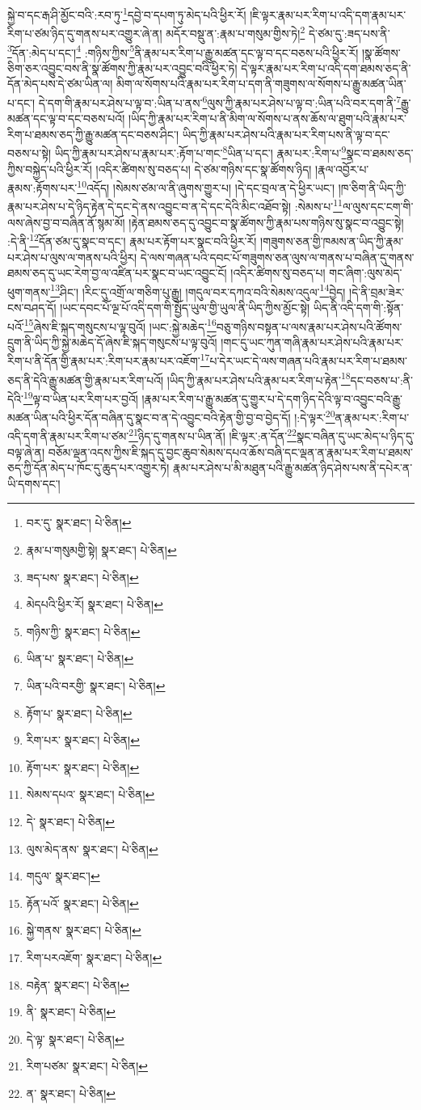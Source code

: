 སྐྱེ་བ་དང་རྒ་ཤི་མྱོང་བའི་:རབ་ཏུ་\footnote{བར་དུ་  སྣར་ཐང་།  པེ་ཅིན། }དབྱེ་བ་དཔག་ཏུ་མེད་པའི་ཕྱིར་རོ། །ཇི་ལྟར་རྣམ་པར་རིག་པ་འདི་དག་རྣམ་པར་རིག་པ་ཙམ་ཉིད་དུ་གནས་པར་འགྱུར་ཞེ་ན། མདོར་བསྡུ་ན་:རྣམ་པ་གསུམ་གྱིས་ཏེ།\footnote{རྣམ་པ་གསུམགྱི་སྟེ།  སྣར་ཐང་།  པེ་ཅིན། } དེ་ཙམ་དུ་:ཟད་པས་ནི་\footnote{ཟད་པས་  སྣར་ཐང་།  པེ་ཅིན། }དོན་:མེད་པ་དང་།\footnote{མེདཔའི་ཕྱིར་རོ།  སྣར་ཐང་།  པེ་ཅིན། } :གཉིས་ཀྱིས་\footnote{གཉིས་ཀྱི་  སྣར་ཐང་།  པེ་ཅིན། }ནི་རྣམ་པར་རིག་པ་རྒྱུ་མཚན་དང་ལྟ་བ་དང་བཅས་པའི་ཕྱིར་རོ། །སྣ་ཚོགས་ཅིག་ཅར་འབྱུང་བས་ནི་སྣ་ཚོགས་ཀྱི་རྣམ་པར་འབྱུང་བའི་ཕྱིར་ཏེ། དེ་ལྟར་རྣམ་པར་རིག་པ་འདི་དག་ཐམས་ཅད་ནི་དོན་མེད་པས་དེ་ཙམ་ཡིན་ལ། མིག་ལ་སོགས་པའི་རྣམ་པར་རིག་པ་དག་ནི་གཟུགས་ལ་སོགས་པ་རྒྱུ་མཚན་ཡིན་པ་དང་། དེ་དག་གི་རྣམ་པར་ཤེས་པ་ལྟ་བ་:ཡིན་པ་ནས་\footnote{ཡིན་པ་  སྣར་ཐང་།  པེ་ཅིན། }ལུས་ཀྱི་རྣམ་པར་ཤེས་པ་ལྟ་བ་:ཡིན་པའི་བར་དག་ནི་\footnote{ཡིན་པའི་བརགྱི་  སྣར་ཐང་།  པེ་ཅིན། }རྒྱུ་མཚན་དང་ལྟ་བ་དང་བཅས་པའོ། །ཡིད་ཀྱི་རྣམ་པར་རིག་པ་ནི་མིག་ལ་སོགས་པ་ནས་ཆོས་ལ་ཐུག་པའི་རྣམ་པར་རིག་པ་ཐམས་ཅད་ཀྱི་རྒྱུ་མཚན་དང་བཅས་ཤིང་། ཡིད་ཀྱི་རྣམ་པར་ཤེས་པའི་རྣམ་པར་རིག་པས་ནི་ལྟ་བ་དང་བཅས་པ་སྟེ། ཡིད་ཀྱི་རྣམ་པར་ཤེས་པ་རྣམ་པར་:རྟོག་པ་གང་\footnote{རྟོག་པ་  སྣར་ཐང་།  པེ་ཅིན། }ཡིན་པ་དང་། རྣམ་པར་:རིག་པ་\footnote{རིག་པར་  སྣར་ཐང་།  པེ་ཅིན། }སྣང་བ་ཐམས་ཅད་ཀྱིས་བསྐྱེད་པའི་ཕྱིར་རོ། །འདིར་ཚིགས་སུ་བཅད་པ། དེ་ཙམ་གཉིས་དང་སྣ་ཚོགས་ཉིད། །རྣལ་འབྱོར་པ་རྣམས་:རྟོགས་པར་\footnote{རྟོག་པར་  སྣར་ཐང་།  པེ་ཅིན། }འདོད། །སེམས་ཙམ་ལ་ནི་ཞུགས་གྱུར་པ། །དེ་དང་བྲལ་ན་དེ་ཕྱིར་ཡང་། །ཁ་ཅིག་ནི་ཡིད་ཀྱི་རྣམ་པར་ཤེས་པ་དེ་ཉིད་རྟེན་དེ་དང་དེ་ནས་འབྱུང་བ་ན་དེ་དང་དེའི་མིང་འཐོབ་སྟེ། :སེམས་པ་\footnote{སེམས་དཔའ་  སྣར་ཐང་།  པེ་ཅིན། }ལ་ལུས་དང་ངག་གི་ལས་ཞེས་བྱ་བ་བཞིན་ནོ་སྙམ་མོ། །རྟེན་ཐམས་ཅད་དུ་འབྱུང་བ་སྣ་ཚོགས་ཀྱི་རྣམ་པས་གཉིས་སུ་སྣང་བ་འབྱུང་སྟེ། :དེ་ནི་\footnote{དེ་  སྣར་ཐང་།  པེ་ཅིན། }དོན་ཙམ་དུ་སྣང་བ་དང་། རྣམ་པར་རྟོག་པར་སྣང་བའི་ཕྱིར་རོ། །གཟུགས་ཅན་གྱི་ཁམས་ན་ཡིད་ཀྱི་རྣམ་པར་ཤེས་པ་ལུས་ལ་གནས་པའི་ཕྱིར། དེ་ལས་གཞན་པའི་དབང་པོ་གཟུགས་ཅན་ལུས་ལ་གནས་པ་བཞིན་དུ་གནས་ཐམས་ཅད་དུ་ཡང་རེག་བྱ་ལ་འཛིན་པར་སྣང་བ་ཡང་འབྱུང་ངོ། །འདིར་ཚིགས་སུ་བཅད་པ། གང་ཞིག་:ལུས་མེད་ཕུག་གནས་\footnote{ལུས་མེད་ནས་  སྣར་ཐང་།  པེ་ཅིན། }ཤིང་། །རིང་དུ་འགྲོ་ལ་གཅིག་པུ་རྒྱུ། །གདུལ་བར་དཀའ་བའི་སེམས་འདུལ་\footnote{གདུལ་  སྣར་ཐང་། }བྱེད། །དེ་ནི་བྲམ་ཟེར་ངས་བཤད་དོ། །ཡང་དབང་པོ་ལྔ་པོ་འདི་དག་གི་སྤྱོད་ཡུལ་གྱི་ཡུལ་ནི་ཡིད་ཀྱིས་མྱོང་སྟེ། ཡིད་ནི་འདི་དག་གི་:སྟོན་པའོ་\footnote{རྟོན་པའོ་  སྣར་ཐང་།  པེ་ཅིན། }ཞེས་ཇི་སྐད་གསུངས་པ་ལྟ་བུའོ། །ཡང་:སྐྱེ་མཆེད་\footnote{སྐྱེ་གནས་  སྣར་ཐང་།  པེ་ཅིན། }བཅུ་གཉིས་བསྟན་པ་ལས་རྣམ་པར་ཤེས་པའི་ཚོགས་དྲུག་ནི་ཡིད་ཀྱི་སྐྱེ་མཆེད་དོ་ཞེས་ཇི་སྐད་གསུངས་པ་ལྟ་བུའོ། །གང་དུ་ཡང་ཀུན་གཞི་རྣམ་པར་ཤེས་པའི་རྣམ་པར་རིག་པ་ནི་དོན་གྱི་རྣམ་པར་:རིག་པར་རྣམ་པར་འཇོག་\footnote{རིག་པརའཇོག་  སྣར་ཐང་།  པེ་ཅིན། }པ་དེར་ཡང་དེ་ལས་གཞན་པའི་རྣམ་པར་རིག་པ་ཐམས་ཅད་ནི་དེའི་རྒྱུ་མཚན་གྱི་རྣམ་པར་རིག་པའོ། །ཡིད་ཀྱི་རྣམ་པར་ཤེས་པའི་རྣམ་པར་རིག་པ་རྟེན་\footnote{བརྟེན་  སྣར་ཐང་།  པེ་ཅིན། }དང་བཅས་པ་:ནི་དེའི་\footnote{ནི་  སྣར་ཐང་།  པེ་ཅིན། }ལྟ་བ་ཡིན་པར་རིག་པར་བྱའོ། །རྣམ་པར་རིག་པ་རྒྱུ་མཚན་དུ་གྱུར་པ་དེ་དག་ཉིད་དེའི་ལྟ་བ་འབྱུང་བའི་རྒྱུ་མཚན་ཡིན་པའི་ཕྱིར་དོན་བཞིན་དུ་སྣང་བ་ན་དེ་འབྱུང་བའི་རྟེན་གྱི་བྱ་བ་བྱེད་དོ། །:དེ་ལྟར་\footnote{དེ་ལྟ་  སྣར་ཐང་།  པེ་ཅིན། }ན་རྣམ་པར་:རིག་པ་འདི་དག་ནི་རྣམ་པར་རིག་པ་ཙམ་\footnote{རིག་པཙམ་  སྣར་ཐང་།  པེ་ཅིན། }ཉིད་དུ་གནས་པ་ཡིན་ནོ། །ཇི་ལྟར་:ན་དོན་\footnote{ན་  སྣར་ཐང་།  པེ་ཅིན། }སྣང་བཞིན་དུ་ཡང་མེད་པ་ཉིད་དུ་བལྟ་ཞེ་ན། བཅོམ་ལྡན་འདས་ཀྱིས་ཇི་སྐད་དུ་བྱང་ཆུབ་སེམས་དཔའ་ཆོས་བཞི་དང་ལྡན་ན་རྣམ་པར་རིག་པ་ཐམས་ཅད་ཀྱི་དོན་མེད་པ་ཁོང་དུ་ཆུད་པར་འགྱུར་ཏེ། རྣམ་པར་ཤེས་པ་མི་མཐུན་པའི་རྒྱུ་མཚན་ཉིད་ཤེས་པས་ནི་དཔེར་ན་ཡི་དགས་དང་། 